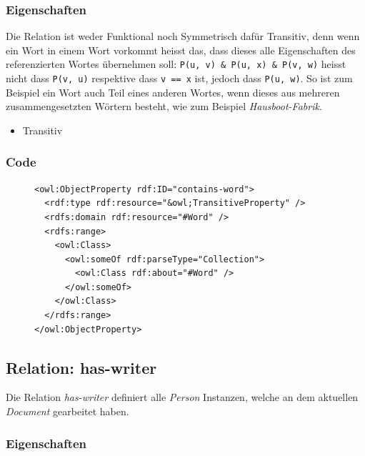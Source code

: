 \documentclass[
    11pt,
    latin1,
    a4paper,
    oneside
]{scrreprt}
\let\oldemph=\emph
\renewcommand{\emph}[1]{\index{#1}\oldemph{#1}}
\begin{document}
\subsubsection{Eigenschaften} \label{sec:rel_containsword_settings}

Die Relation ist weder Funktional noch Symmetrisch daf\"ur Transitiv, denn wenn ein Wort in einem Wort vorkommt heisst das, dass dieses alle Eigenschaften des referenzierten Wortes \"ubernehmen soll: \texttt{P(u, v) \& P(u, x) \& P(v, w)} heisst nicht dass \texttt{P(v, u)} respektive dass \texttt{v == x} ist, jedoch dass \texttt{P(u, w)}. So ist zum Beispiel ein Wort auch Teil eines anderen Wortes, wenn dieses aus mehreren zusammengesetzten W\"ortern besteht, wie zum Beispiel \textit{Hausboot-Fabrik}.

\begin{itemize} \setlength{\itemsep}{0cm}
  \item Transitiv
\end{itemize}

\subsubsection{Code} \label{sec:rel_containsword_code}

\begin{figure}[H]
 \lstset{language=XML}
 \begin{lstlisting}[label=owl:containsword,caption={Die Relation \emph{contsins-word} gibt an, aus welchen W\"ortern das Wort besteht}]
<owl:ObjectProperty rdf:ID="contains-word">
  <rdf:type rdf:resource="&owl;TransitiveProperty" />
  <rdfs:domain rdf:resource="#Word" />
  <rdfs:range>
    <owl:Class>
      <owl:someOf rdf:parseType="Collection">
        <owl:Class rdf:about="#Word" />
      </owl:someOf>
    </owl:Class>
  </rdfs:range>
</owl:ObjectProperty>
 \end{lstlisting}
\end{figure}


\subsection{Relation: has-writer} \label{sec:rel_haswriter}

Die Relation \emph{has-writer} definiert alle \emph{Person} Instanzen, welche an dem aktuellen \emph{Document} gearbeitet haben.

\subsubsection{Eigenschaften} \label{sec:rel_haswriter_settings}
\end{document}

